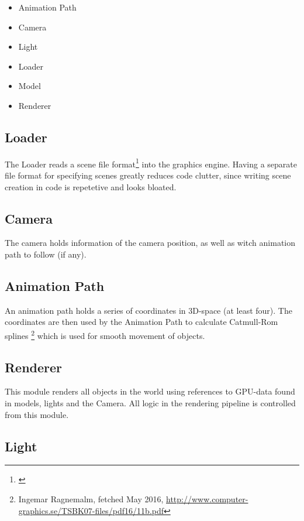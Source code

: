 \documentclass{article}
\begin{document}
\begin{itemize}
    \item Animation Path
    \item Camera
    \item Light
    \item Loader
    \item Model
    \item Renderer
\end{itemize}

\subsection{Loader}

The Loader reads a scene file format\footnote{\url{}} into the graphics engine. Having a separate file format for specifying scenes greatly reduces code clutter, since writing scene creation in code is repetetive and looks bloated.

\subsection{Camera}

The camera holds information of the camera position, as well as witch animation path to follow (if any).

\subsection{Animation Path}

An animation path holds a series of coordinates in 3D-space (at least four). The coordinates are then used by the Animation Path to calculate Catmull-Rom splines \footnote{Ingemar Ragnemalm, fetched May 2016, \url{http://www.computer-graphics.se/TSBK07-files/pdf16/11b.pdf}} which is used for smooth movement of objects.

\subsection{Renderer}

This module renders all objects in the world using references to GPU-data found in models, lights and the Camera. All logic in the rendering pipeline is controlled from this module.

\subsection{Light}
\end{document}
